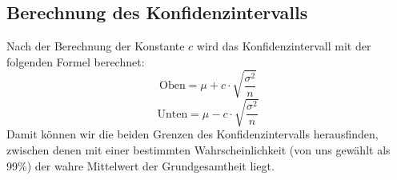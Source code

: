 \subsection{Berechnung des Konfidenzintervalls}
Nach der Berechnung der Konstante \(c\) wird das Konfidenzintervall mit der folgenden Formel berechnet:
\[
\text{Oben} = \mu + c \cdot \sqrt{\frac{\sigma^2}{n}}
\]
\[
\text{Unten} = \mu - c \cdot \sqrt{\frac{\sigma^2}{n}}
\]
Damit können wir die beiden Grenzen des Konfidenzintervalls herausfinden, zwischen denen mit einer bestimmten Wahrscheinlichkeit (von uns gewählt als 99\%) der wahre Mittelwert der Grundgesamtheit liegt.

